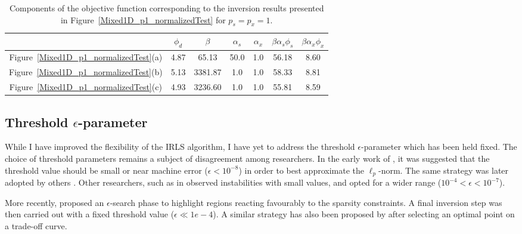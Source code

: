 \begin{table}\centering
\begin{tabular}{| c | c | c | c | c | c | c |} \hline
& $\phi_d$ & $\beta$ &  $\alpha_s$ & $\alpha_x$ & $\beta\alpha_s\phi_s$ & $\beta\alpha_x\phi_x$ \\ \hline
Figure~\ref{Mixed1D_p1_normalizedTest}(a) &4.87 & 65.13 & 50.0 & 1.0 & 56.18 & 8.60 \\ \hline
Figure~\ref{Mixed1D_p1_normalizedTest}(b) &5.13 & 3381.87 & 1.0 & 1.0 & 58.33 & 8.81\\ \hline
Figure~\ref{Mixed1D_p1_normalizedTest}(c) &4.93 & 3236.60 & 1.0 & 1.0 & 55.81 & 8.59\\ \hline
\end{tabular}
\caption{Components of the objective function corresponding to the inversion results presented in Figure~\ref{Mixed1D_p1_normalizedTest} for $p_s=p_x=1$. }
\label{IRLS_ScalingTest}
\end{table}

\subsection{Threshold $\epsilon$-parameter}
While I have improved the flexibility of the IRLS algorithm, I have yet to address the threshold $\epsilon$-parameter which has been held fixed.
The choice of threshold parameters remains a subject of disagreement among researchers.
In the early work of \cite{LastKubik83}, it was suggested that the threshold value should be small or near machine error ($\epsilon < 10^{-8}$) in order to best approximate the $\ell_p$-norm. The same strategy was later adopted by others \cite[]{BarbosaSilva94, Stocco09}.
Other researchers, such as in \cite{Ajo-Franklin07} observed instabilities with small values, and opted for a wider range ($10^{-4} < \epsilon < 10^{-7}$).

More recently, \cite{SunLi14} proposed an $\epsilon$-search phase to highlight regions reacting favourably to the sparsity constraints. A final inversion step was then carried out with a fixed threshold value ($\epsilon \ll 1e-4$). A similar strategy has also been proposed by \cite{ZhdanovTolstaya2004} after selecting an optimal point on a trade-off curve.

